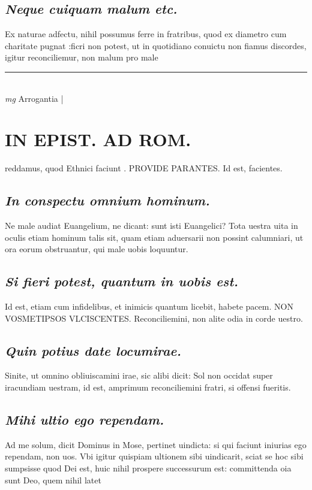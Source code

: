 \documentclass{article}
\begin{document}
\begin{pages}
\subsection*{\textit{Neque cuiquam malum etc. }}\pstart Ex naturae adfectu, nihil possumus ferre in fratribus, quod ex diametro cum charitate pugnat :ficri non potest, ut in quotidiano conuictu non fiamus discordes, igitur reconciliemur, non malum pro male  \pend
\vspace{0.5cm}\noindent
\vspace{0.2cm}\rule{1cm}{0.2pt}\\ 
\hspace{0.2cm}\textit{mg}
\footnotesize Arrogantia 
\normalsize| 
\section*{IN EPIST. AD ROM.  }
\marginpar{[ p.149 ]}\pstart reddamus, quod Ethnici faciunt . PROVIDE PARANTES. Id est, facientes.  \pend
{}
{}
\subsection*{\textit{In conspectu omnium hominum. }}\pstart Ne male audiat Euangelium, ne dicant: sunt isti Euangelici? Tota uestra uita in oculis etiam hominum talis sit, quam etiam aduersarii non possint calumniari, ut ora eorum obstruantur, qui male uobis loquuntur.  \pend
{}
{}
\subsection*{\textit{Si fieri potest, quantum in uobis est. }}\pstart Id est, etiam cum infidelibus, et inimicis quantum licebit, habete pacem. NON VOSMETIPSOS VLCISCENTES. Reconciliemini, non alite odia in corde uestro.  \pend
{}
{}
\subsection*{\textit{Quin potius date locumirae. }}\pstart Sinite, ut omnino obliuiscamini irae, sic alibi dicit: Sol non occidat super iracundiam uestram, id est, amprimum reconciliemini fratri, si offensi fueritis.   \pend
{}
{}
\subsection*{\textit{Mihi ultio ego rependam. }}\pstart Ad me solum, dicit Dominus in Mose, pertinet uindicta: si qui faciunt iniurias ego rependam, non uos. Vbi igitur quispiam ultionem sibi uindicarit, sciat se hoc sibi sumpsisse quod Dei est, huic nihil prospere successurum est: committenda oia sunt Deo, quem nihil latet\pend
{}
{}

\end{pages}
\end{document}
